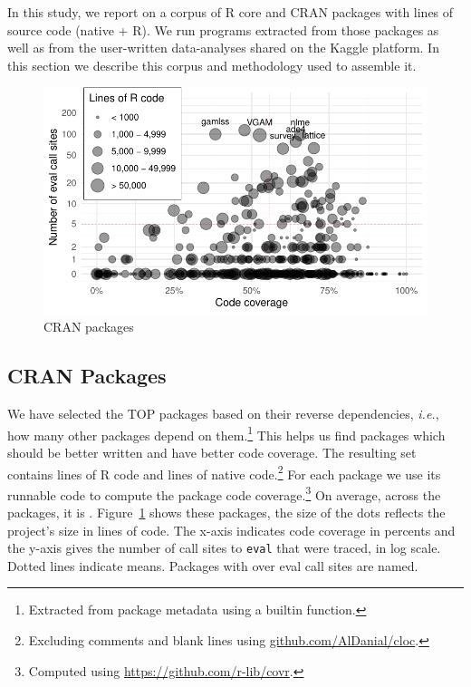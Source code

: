 \documentclass[USenglish,cleveref, autoref, thm-restate]{lipics-v2019}
\newcommand{\ie}{\emph{i.e.},\xspace}
\newcommand{\eval}{\texttt{eval}\xspace}
\begin{document}
In this study, we report on a corpus of \CorpusCorePackages R core and
\CorpusPackages CRAN packages with \CorpusAllCodeRnd lines of source code
(native + R).  We run \CorpusAllProgramsRnd programs extracted from those
packages as well as from the user-written data-analyses shared on the Kaggle
platform. In this section we describe this corpus and methodology used to
assemble it.

\begin{figure}[!h]\centering\includegraphics[width=\linewidth]
  {corpus.pdf}\caption{CRAN packages}\label{fig:corpus}
\end{figure}

\subsection{CRAN Packages}

We have selected the TOP \CorpusPackages packages based on their reverse
dependencies, \ie how many other packages depend on them.\footnote{Extracted
  from package metadata using a builtin function.}  This helps us find
packages which should be better written and have better code coverage.  The
resulting set contains \CorpusRCodeRnd lines of R code and
\CorpusNativeCodeRnd lines of native code.\footnote{Excluding comments and
  blank lines using \url{github.com/AlDanial/cloc}.}  For each package we
use its runnable code to compute the package code coverage.\footnote{Computed
  using \url{ https://github.com/r-lib/covr}.} On average, across the
\CorpusPackages packages, it is \CorpusMeanExprCoverage.
Figure~\ref{fig:corpus} shows these packages, the size of the dots reflects
the project's size in lines of code.  The x-axis indicates code coverage in
percents and the y-axis gives the number of call sites to \eval that were traced, in log
scale. Dotted lines indicate means. Packages with over
\CorpusEvalsPackageTreshold eval call sites are named.
\end{document}
